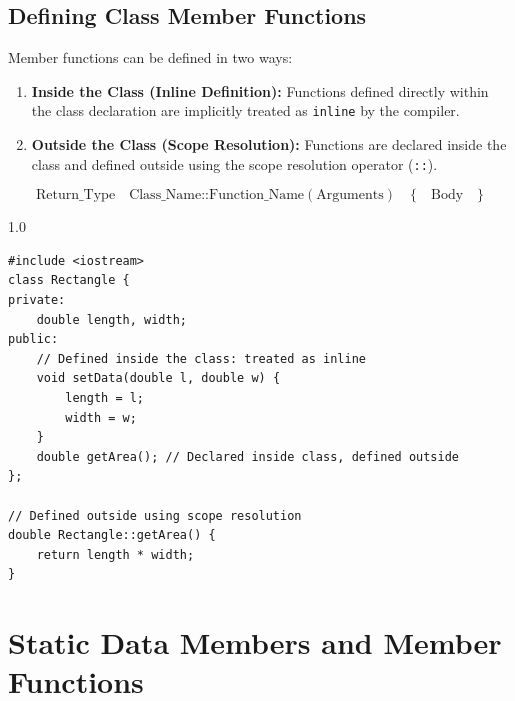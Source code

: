 \documentclass[12pt,a4paper]{article}
\begin{document}
\subsection{Defining Class Member Functions}
Member functions can be defined in two ways:
\begin{enumerate}[label=\textbf{\arabic*.}, leftmargin=*, itemsep=4pt]
  \item \textbf{Inside the Class (Inline Definition):} Functions defined directly within the class declaration are implicitly treated as \texttt{inline} by the compiler.
  \item \textbf{Outside the Class (Scope Resolution):} Functions are declared inside the class and defined outside using the scope resolution operator (\texttt{::}).
\end{enumerate}

\begin{tcolorbox}[defbox, title={\textbf{Member Function Syntax Outside Class}}]
\begin{equation}
  \text{Return\_Type} \quad \text{Class\_Name}\texttt{::}\text{Function\_Name}(\text{Arguments}) \quad \{ \quad \text{Body} \quad \}
\end{equation}
\end{tcolorbox}

\begin{tcolorbox}[examplebox, title={Code Example: Inside vs. Outside class definitions}]
\begin{spacing}{1.0}
\begin{verbatim}
#include <iostream>
class Rectangle {
private:
    double length, width;
public:
    // Defined inside the class: treated as inline
    void setData(double l, double w) {
        length = l;
        width = w;
    }
    double getArea(); // Declared inside class, defined outside
};

// Defined outside using scope resolution
double Rectangle::getArea() {
    return length * width;
}
\end{verbatim}
\end{spacing}
\end{tcolorbox}

\section{Static Data Members and Member Functions}
\end{document}
